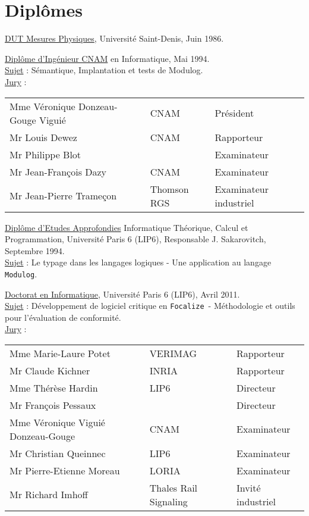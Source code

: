 \documentclass[a4paper,12pt]{article}
\newcommand{\Modulog}{{\tt Modulog}}
\newcommand{\Focal}{{\tt Focalize}}
\newcommand{\smallspace}{\vspace{0.25cm}}
\begin{document}
\newpage
\section{Dipl\^omes}

\hspace{-0.6cm}\underline{DUT Mesures Physiques}, Universit\'e Saint-Denis, Juin 1986.

\smallspace
\hspace{-0.6cm}\underline{Dipl\^ome d'Ing\'enieur CNAM} en Informatique, Mai 1994.
\\
\underline{Sujet} : S\'emantique, Implantation et tests de Modulog.
\\
\underline{Jury} :
\begin{tabular}{lll}
  Mme V\'eronique Donzeau-Gouge Vigui\'e & CNAM & Pr\'esident  \\
  Mr Louis Dewez & CNAM & Rapporteur \\
  Mr Philippe Blot & & Examinateur \\
  Mr Jean-Fran\c{c}ois Dazy & CNAM & Examinateur \\
  Mr Jean-Pierre Trame\c{c}on & Thomson RGS & Examinateur industriel \\
\end{tabular}

\smallspace
\hspace{-0.6cm}\underline{Dipl\^ome d'Etudes Approfondies} Informatique Th\'eorique,
Calcul et Programmation, Universit\'e Paris 6 (LIP6), Responsable
J. Sakarovitch, Septembre 1994.
\\
\underline{Sujet} : Le typage dans les langages logiques - Une
application au langage \Modulog.

\smallspace
\hspace{-0.6cm}\underline{Doctorat en Informatique}, Universit\'e Paris 6 (LIP6),
Avril 2011. 
\\
\underline{Sujet} : D\'eveloppement de logiciel critique en \Focal\ -
M\'ethodologie et outils pour l'\'evaluation de conformit\'e.
\\
\underline{Jury} :
\begin{tabular}{lll}
  Mme Marie-Laure Potet & VERIMAG & Rapporteur \\
  Mr Claude Kichner & INRIA & Rapporteur \\
  Mme Th\'er\`ese Hardin & LIP6 & Directeur \\
  Mr Fran\c{c}ois Pessaux & & Directeur \\
  Mme V\'eronique Vigui\'e Donzeau-Gouge & CNAM & Examinateur \\
  Mr Christian Queinnec & LIP6 & Examinateur \\
  Mr Pierre-Etienne Moreau & LORIA & Examinateur \\
  Mr Richard Imhoff & Thales Rail Signaling & Invit\'e industriel\\
\end{tabular}
\end{document}
